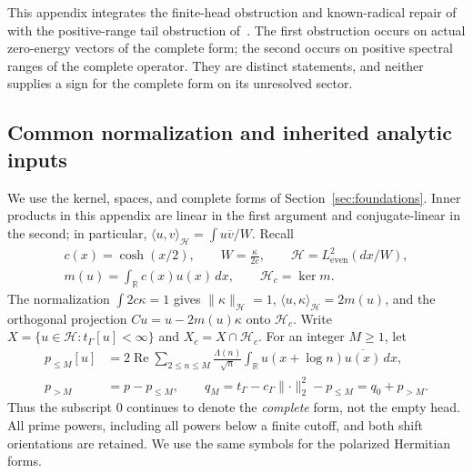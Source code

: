 \documentclass[11pt,a4paper]{article}
\numberwithin{equation}{section}
\theoremstyle{definition}\newtheorem{definition}[theorem]{Definition}
\theoremstyle{remark}\newtheorem{remark}[theorem]{Remark}
\newcommand{\R}{\mathbb R}\newcommand{\C}{\mathbb C}\newcommand{\N}{\mathbb N}
\newcommand{\Hh}{\mathcal H}\newcommand{\Hw}{\mathcal H}
\newcommand{\tg}{t_\Gamma}\newcommand{\cg}{c_\Gamma}
\newcommand{\ip}[2]{\langle#1,#2\rangle}\newcommand{\norm}[1]{\lVert#1\rVert}\newcommand{\abs}[1]{\lvert#1\rvert}
\begin{document}
This appendix integrates the finite-head obstruction and known-radical repair
of~\cite{vfourPrimeHead} with the positive-range tail obstruction
of~\cite{vfourPositiveRange}.  The first obstruction occurs on actual
zero-energy vectors of the complete form; the second occurs on positive
spectral ranges of the complete operator.  They are distinct statements,
and neither supplies a sign for the complete form on its unresolved sector.

\subsection{Common normalization and inherited analytic inputs}
\label{vfourA:subsec:inputs}

We use the kernel, spaces, and complete forms of
Section~\ref{sec:foundations}.  Inner products in this appendix are linear
in the first argument and conjugate-linear in the second; in particular,
$\ip uv_{\Hh}=\int u\overline v/W$.  Recall
\[
 \begin{gathered}
 c(x)=\cosh(x/2),\qquad W=\frac{\kappa}{2c},\qquad
 \Hh=L^2_{\mathrm{even}}(dx/W),\\
 m(u)=\int_\R c(x)u(x)\,dx,\qquad \Hh_c=\ker m.
 \end{gathered}
\]
The normalization $\int2c\kappa=1$ gives
$\norm\kappa_{\Hh}=1$, $\ip u\kappa_{\Hh}=2m(u)$, and the orthogonal
projection $Cu=u-2m(u)\kappa$ onto $\Hh_c$.  Write
$X=\{u\in\Hh:\tg[u]<\infty\}$ and $X_c=X\cap\Hh_c$.
For an integer $M\ge1$, let
\begin{align}
 p_{\le M}[u]&=2\operatorname{Re}\sum_{2\le n\le M}
 \frac{\Lambda(n)}{\sqrt n}
 \int_\R u(x+\log n)\overline{u(x)}\,dx,\label{vfourA:eq:head}\\
 p_{>M}&=p-p_{\le M},\qquad
 q_M=\tg-\cg\norm{\cdot}_2^2-p_{\le M}
     =q_0+p_{>M}.\label{vfourA:eq:head-complete}
\end{align}
Thus the subscript $0$ continues to denote the \emph{complete} form, not
the empty head.  All prime powers, including all powers below a finite
cutoff, and both shift orientations are retained.  We use the same symbols
for the polarized Hermitian forms.
\end{document}
